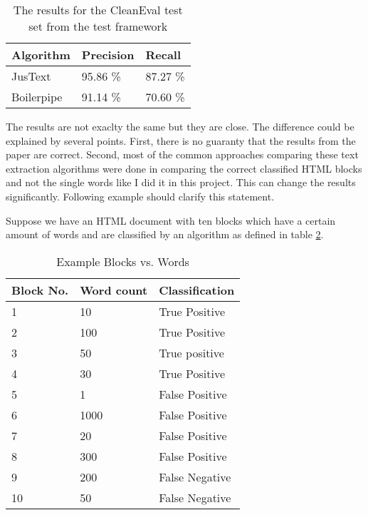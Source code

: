 \begin{table}[!ht]
\begin{tabular}{| p{3cm} | p{3cm} | p{3cm} | }
    \hline
    \textbf{Algorithm}      & \textbf{Precision}  & \textbf{Recall} 				\\ \hline
    JusText     & 95.86 \%       &  87.27 \%		\\ \hline
    Boilerpipe & 91.14 \%       &  70.60 \%		\\ \hline
\end{tabular}
\caption{The results for the CleanEval test set from the test framework}
\label{table:resultsComparison}
\end{table}


The results are not exaclty the same but they are close. The difference could be explained by several points. First, there is no guaranty that the results from the paper are correct. Second, most of the common approaches comparing these text extraction algorithms were done in comparing the correct classified HTML blocks and not the single words like I did it in this project. This can change the results significantly. Following example should clarify this statement.

Suppose we have an HTML document with ten blocks which have a certain amount of words and are classified by an algorithm as defined in table \ref{blockWordExample}.

\begin{table}[!ht]
\begin{tabular}{| p{2cm} | p{3cm} | p{3cm} | }
    \hline
    \textbf{Block No.}      & \textbf{Word count}  & \textbf{Classification} 				\\ \hline
    1     & 10      	&  True Positive	\\ \hline
    2     & 100     	&  True Positive	\\ \hline
    3     & 50       	&  True positive	\\ \hline
    4     & 30       	&  True Positive	\\ \hline
    5     & 1       	&  False Positive	\\ \hline
    6     & 1000      	&  False Positive	\\ \hline
    7     & 20      	&  False Positive	\\ \hline
    8     & 300       	&  False Positive	\\ \hline
    9     & 200       	&  False Negative	\\ \hline
    10    & 50        	&  False Negative	\\ \hline
\end{tabular}
\caption{Example Blocks vs. Words}
\label{blockWordExample}
\end{table}

